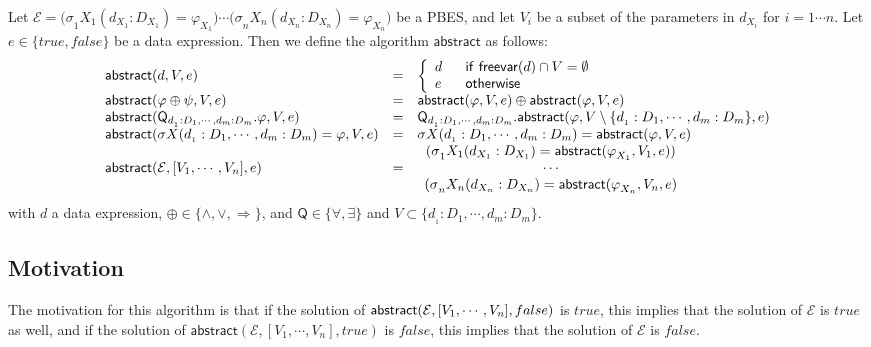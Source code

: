 \documentclass{article}
\begin{document}
Let $\mathcal{E=(\sigma }_{1}X_{1}(d_{X_{1}}:D_{X_{1}})=\varphi
_{X_{1}})\cdots \mathcal{(\sigma }_{n}X_{n}(d_{X_{n}}:D_{X_{n}})=\varphi
_{X_{n}})$ be a PBES, and let $V_{i}$ be a subset of the parameters in $%
d_{X_{i}}$ for $i=1\cdots n$. Let $e\in \{true,false\}$ be a data
expression. Then we define the algorithm $\mathsf{abstract}$ as follows:%
\begin{equation*}
\begin{array}{lll}
\mathsf{abstract}(d,V,e) & = & \left\{ 
\begin{array}{ll}
d & \text{\textsf{if}\ }\mathsf{freevar}(d)\cap V=\emptyset \\ 
e & \text{\textsf{otherwise}}%
\end{array}%
\right. \\ 
\mathsf{abstract}(\varphi \oplus \psi ,V,e) & = & \mathsf{abstract}(\varphi
,V,e)\oplus \mathsf{abstract}(\varphi ,V,e) \\ 
\mathsf{abstract}(\mathsf{Q}_{d_{_{1}}:D_{1},\cdots ,d_{m}:D_{m}}.\varphi
,V,e) & = & \mathsf{Q}_{d_{_{1}}:D_{1},\cdots ,d_{m}:D_{m}}.\mathsf{abstract}%
(\varphi ,V\setminus \{d_{_{1}}:D_{1},\cdots ,d_{m}:D_{m}\},e) \\ 
\mathsf{abstract}(\mathcal{\sigma }X(d_{_{1}}:D_{1},\cdots
,d_{m}:D_{m})=\varphi ,V,e) & = & \mathcal{\sigma }X(d_{_{1}}:D_{1},\cdots
,d_{m}:D_{m})=\mathsf{abstract}(\varphi ,V,e) \\ 
\mathsf{abstract}(\mathcal{E},[V_{1},\cdots ,V_{n}],e) & = & 
\begin{array}{c}
\mathcal{(\sigma }_{1}X_{1}(d_{X_{1}}:D_{X_{1}})=\mathsf{abstract(}\varphi
_{X_{1}},V_{1},e)) \\ 
\cdots \\ 
\mathcal{(\sigma }_{n}X_{n}(d_{X_{n}}:D_{X_{n}})=\mathsf{abstract(}\varphi
_{X_{n}},V_{n},e)%
\end{array}%
\end{array}%
\end{equation*}%
with $d$ a data expression, $\oplus \in \{\wedge ,\vee ,\Rightarrow \}$, and 
$\mathsf{Q\in \{\forall ,\exists \}}$ and $V\subset \{d_{_{1}}:D_{1},\cdots
,d_{m}:D_{m}\}$.

\subsection{Motivation}

The motivation for this algorithm is that if the solution of $\mathsf{%
abstract}(\mathcal{E},[V_{1},\cdots ,V_{n}],false)$ is $true$, this implies
that the solution of $\mathcal{E}$ is $true$ as well, and if the solution of 
$\mathsf{abstract}(\mathcal{E},[V_{1},\cdots ,V_{n}],true)$ is $false$, this
implies that the solution of $\mathcal{E}$ is $false$.
\end{document}
